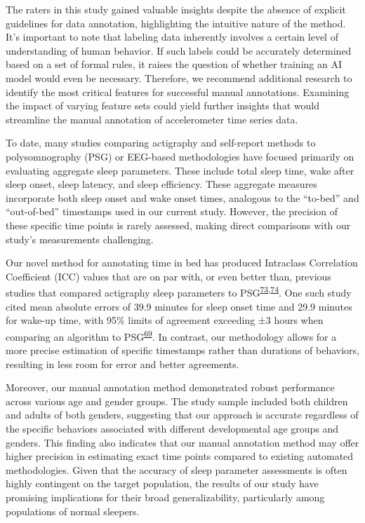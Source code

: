 \documentclass[
  9pt,
]{scrbook}
\begin{document}
The raters in this study gained valuable insights despite the absence of
explicit guidelines for data annotation, highlighting the intuitive
nature of the method. It's important to note that labeling data
inherently involves a certain level of understanding of human behavior.
If such labels could be accurately determined based on a set of formal
rules, it raises the question of whether training an AI model would even
be necessary. Therefore, we recommend additional research to identify
the most critical features for successful manual annotations. Examining
the impact of varying feature sets could yield further insights that
would streamline the manual annotation of accelerometer time series
data.

To date, many studies comparing actigraphy and self-report methods to
polysomnography (PSG) or EEG-based methodologies have focused primarily
on evaluating aggregate sleep parameters. These include total sleep
time, wake after sleep onset, sleep latency, and sleep efficiency. These
aggregate measures incorporate both sleep onset and wake onset times,
analogous to the ``to-bed'' and ``out-of-bed'' timestamps used in our
current study. However, the precision of these specific time points is
rarely assessed, making direct comparisons with our study's measurements
challenging.

Our novel method for annotating time in bed has produced Intraclass
Correlation Coefficient (ICC) values that are on par with, or even
better than, previous studies that compared actigraphy sleep parameters
to
PSG\textsuperscript{\protect\hyperlink{ref-haghayegh_application_2020}{73},\protect\hyperlink{ref-yavuz-kodat_2019}{74}}.
One such study cited mean absolute errors of 39.9 minutes for sleep
onset time and 29.9 minutes for wake-up time, with 95\% limits of
agreement exceeding ±3 hours when comparing an algorithm to
PSG\textsuperscript{\protect\hyperlink{ref-van_hees_estimating_2018}{69}}.
In contrast, our methodology allows for a more precise estimation of
specific timestamps rather than durations of behaviors, resulting in
less room for error and better agreements.

Moreover, our manual annotation method demonstrated robust performance
across various age and gender groups. The study sample included both
children and adults of both genders, suggesting that our approach is
accurate regardless of the specific behaviors associated with different
developmental age groups and genders. This finding also indicates that
our manual annotation method may offer higher precision in estimating
exact time points compared to existing automated methodologies. Given
that the accuracy of sleep parameter assessments is often highly
contingent on the target population, the results of our study have
promising implications for their broad generalizability, particularly
among populations of normal sleepers.
\end{document}
